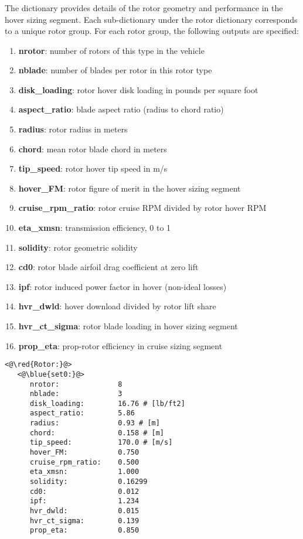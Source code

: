 \subsubsection{}
The  dictionary provides details of the rotor geometry and performance in the hover sizing segment. Each sub-dictionary under the rotor dictionary corresponds to a unique rotor group. For each rotor group, the following outputs are specified:
\begin{enumerate}
\item \textbf{nrotor}: number of rotors of this type in the vehicle 
\item \textbf{nblade}: number of blades per rotor in this rotor type 
\item \textbf{disk\_loading}: rotor hover disk loading in pounds per square foot
\item \textbf{aspect\_ratio}: blade aspect ratio (radius to chord ratio)
\item \textbf{radius}: rotor radius in meters
\item \textbf{chord}: mean rotor blade chord in meters 
\item \textbf{tip\_speed}: rotor hover tip speed in m/s 
\item \textbf{hover\_FM}: rotor figure of merit in the hover sizing segment 
\item \textbf{cruise\_rpm\_ratio}: rotor cruise RPM divided by rotor hover RPM 
\item \textbf{eta\_xmsn}: transmission efficiency, 0 to 1  
\item \textbf{solidity}: rotor geometric solidity  
\item \textbf{cd0}: rotor blade airfoil drag coefficient at zero lift
\item \textbf{ipf}: rotor induced power factor in hover (non-ideal losses)
\item \textbf{hvr\_dwld}: hover download divided by rotor lift share 
\item \textbf{hvr\_ct\_sigma}: rotor blade loading in hover sizing segment 
\item \textbf{prop\_eta}: prop-rotor efficiency in cruise sizing segment
\end{enumerate}

\begin{lstlisting}
<@\red{Rotor:}@>
   <@\blue{set0:}@>
      nrotor:              8 
      nblade:              3 
      disk_loading:        16.76 # [lb/ft2]
      aspect_ratio:        5.86 
      radius:              0.93 # [m]
      chord:               0.158 # [m]
      tip_speed:           170.0 # [m/s]
      hover_FM:            0.750 
      cruise_rpm_ratio:    0.500 
      eta_xmsn:            1.000 
      solidity:            0.16299 
      cd0:                 0.012 
      ipf:                 1.234 
      hvr_dwld:            0.015
      hvr_ct_sigma:        0.139
      prop_eta:            0.850
\end{lstlisting}

